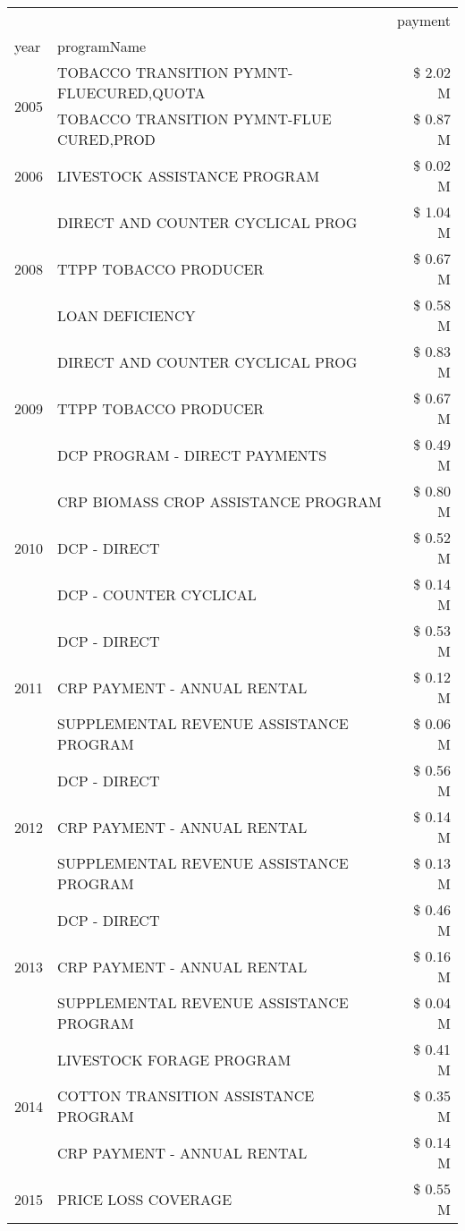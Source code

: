 \begin{tabular}{llr}
\toprule
 &  & payment \\
year & programName &  \\
\midrule
\multirow[t]{2}{*}{2005} & TOBACCO TRANSITION PYMNT-FLUECURED,QUOTA & \$ 2.02 M \\
 & TOBACCO TRANSITION PYMNT-FLUE CURED,PROD & \$ 0.87 M \\
\cline{1-3}
2006 & LIVESTOCK ASSISTANCE PROGRAM & \$ 0.02 M \\
\cline{1-3}
\multirow[t]{3}{*}{2008} & DIRECT AND COUNTER CYCLICAL PROG & \$ 1.04 M \\
 & TTPP TOBACCO PRODUCER & \$ 0.67 M \\
 & LOAN DEFICIENCY & \$ 0.58 M \\
\cline{1-3}
\multirow[t]{3}{*}{2009} & DIRECT AND COUNTER CYCLICAL PROG & \$ 0.83 M \\
 & TTPP TOBACCO PRODUCER & \$ 0.67 M \\
 & DCP PROGRAM - DIRECT PAYMENTS & \$ 0.49 M \\
\cline{1-3}
\multirow[t]{3}{*}{2010} & CRP BIOMASS CROP ASSISTANCE PROGRAM & \$ 0.80 M \\
 & DCP - DIRECT & \$ 0.52 M \\
 & DCP - COUNTER CYCLICAL & \$ 0.14 M \\
\cline{1-3}
\multirow[t]{3}{*}{2011} & DCP - DIRECT & \$ 0.53 M \\
 & CRP PAYMENT - ANNUAL RENTAL & \$ 0.12 M \\
 & SUPPLEMENTAL REVENUE ASSISTANCE PROGRAM & \$ 0.06 M \\
\cline{1-3}
\multirow[t]{3}{*}{2012} & DCP - DIRECT & \$ 0.56 M \\
 & CRP PAYMENT - ANNUAL RENTAL & \$ 0.14 M \\
 & SUPPLEMENTAL REVENUE ASSISTANCE PROGRAM & \$ 0.13 M \\
\cline{1-3}
\multirow[t]{3}{*}{2013} & DCP - DIRECT & \$ 0.46 M \\
 & CRP PAYMENT - ANNUAL RENTAL & \$ 0.16 M \\
 & SUPPLEMENTAL REVENUE ASSISTANCE PROGRAM & \$ 0.04 M \\
\cline{1-3}
\multirow[t]{3}{*}{2014} & LIVESTOCK FORAGE PROGRAM & \$ 0.41 M \\
 & COTTON TRANSITION ASSISTANCE PROGRAM & \$ 0.35 M \\
 & CRP PAYMENT - ANNUAL RENTAL & \$ 0.14 M \\
\cline{1-3}
\multirow[t]{3}{*}{2015} & PRICE LOSS COVERAGE & \$ 0.55 M \\

\end{tabular}
